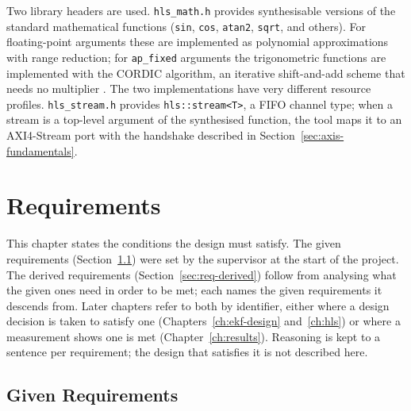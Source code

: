 \documentclass[12pt,a4paper]{article}
\begin{document}
Two library headers are used. \texttt{hls\_math.h} provides
synthesisable versions of the standard mathematical functions
(\texttt{sin}, \texttt{cos}, \texttt{atan2}, \texttt{sqrt}, and
others). For floating-point arguments these are implemented as
polynomial approximations with range reduction; for
\texttt{ap\_fixed} arguments the trigonometric functions are
implemented with the CORDIC algorithm, an iterative shift-and-add
scheme that needs no multiplier \citep{amd_ug1399}. The two
implementations have very different resource profiles.
\texttt{hls\_stream.h} provides \texttt{hls::stream<T>}, a FIFO
channel type; when a stream is a top-level argument of the
synthesised function, the tool maps it to an AXI4-Stream port with
the handshake described in Section~\ref{sec:axis-fundamentals}.

\newpage
\section{Requirements}
\label{ch:requirements}

This chapter states the conditions the design must satisfy. The
given requirements (Section~\ref{sec:req-given}) were set by the
supervisor at the start of the project. The derived requirements
(Section~\ref{sec:req-derived}) follow from analysing what the given
ones need in order to be met; each names the given requirements it
descends from. Later chapters refer to both by identifier, either
where a design decision is taken to satisfy one
(Chapters~\ref{ch:ekf-design} and~\ref{ch:hls}) or where a
measurement shows one is met (Chapter~\ref{ch:results}). Reasoning
is kept to a sentence per requirement; the design that satisfies it
is not described here.

\subsection{Given Requirements}
\label{sec:req-given}
\end{document}
